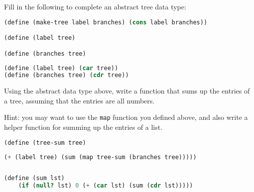 \question Fill in the following to complete an abstract tree data type:

\begin{lstlisting}[language=Scheme]
(define (make-tree label branches) (cons label branches))

(define (label tree)

(define (branches tree)
\end{lstlisting}

\begin{solution}
\begin{lstlisting}[language=Scheme]
(define (label tree) (car tree))
(define (branches tree) (cdr tree))
\end{lstlisting}
\end{solution}

\question Using the abstract data type above, write a function that sums up the
entries of a tree, assuming that the entries are all numbers.

Hint: you may want to use the \texttt{map} function you defined above, and
also write a helper function for summing up the entries of a list.

\begin{lstlisting}[language=Scheme]
(define (tree-sum tree)
\end{lstlisting}
\begin{solution}[0.5in]
\begin{lstlisting}[language=Scheme]
    (+ (label tree) (sum (map tree-sum (branches tree)))))
\end{lstlisting}
\end{solution}
\begin{lstlisting}[language=Scheme]
\end{lstlisting}

\begin{solution}[0.5in]
\begin{lstlisting}[language=Scheme]
(define (sum lst)
    (if (null? lst) 0 (+ (car lst) (sum (cdr lst)))))
\end{lstlisting}
\end{solution}
